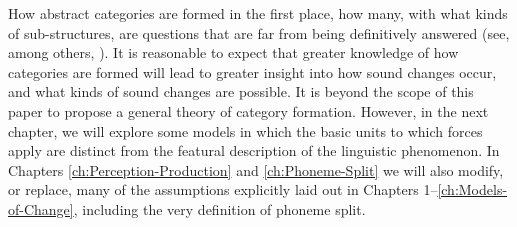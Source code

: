 How abstract categories are formed in the first place, how many,
with what kinds of sub-structures, are questions that are far from
being definitively answered (see, among others, \citet{Peperkamp2006,dillon2013single,feldman2009learning,mcmurray2011information,goldsmith2009learning}).
It is reasonable to expect that greater knowledge of how categories
are formed will lead to greater insight into how sound changes occur,
and what kinds of sound changes are possible. It is beyond the scope
of this paper to propose a general theory of category formation. However,
in the next chapter, we will explore some models in which the basic
units to which forces apply are distinct from the featural description
of the linguistic phenomenon. In Chapters \ref{ch:Perception-Production}
and \ref{ch:Phoneme-Split} we will also modify, or replace, many
of the assumptions explicitly laid out in Chapters 1--\ref{ch:Models-of-Change},
including the very definition of phoneme split.
